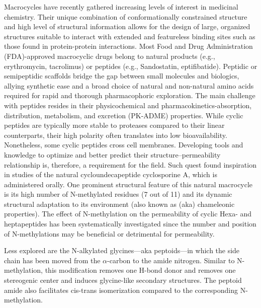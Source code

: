 Macrocycles have recently gathered increasing levels of interest in medicinal chemistry. \cite{Driggers2008, Mallinson2012, Dougherty2017, Marsault2011, Abdalla2018, Marsault2017}
Their unique combination of conformationally constrained structure and high level of structural information allows for the design of large, organized structures suitable to interact with extended and featureless binding sites such as those found in protein-protein interactions.\cite{Janin2008, Chène2006, Scott2016, Modell2016} 
Most Food and Drug Administration (FDA)-approved macrocyclic drugs belong to natural products (e.g., erythromycin, tacrolimus) or peptides (e.g., Sandostatin, eptifibatide). \cite{Giordanetto2014}
Peptidic or semipeptidic scaffolds bridge the gap between small molecules and biologics, allying synthetic ease and a broad choice of natural and non-natural amino acids required for rapid and thorough pharmacophoric exploration. 
The main challenge with peptides resides in their physicochemical and pharmacokinetics-absorption, distribution, metabolism, and excretion (PK-ADME) properties. 
While cyclic peptides are typically more stable to proteases compared to their linear counterparts, their high polarity often translates into low bioavailability.\cite{Naylor2017, Fosgerau2015}
Nonetheless, some cyclic peptides cross cell membranes.\cite{Naylor2017, Wang2014, Nielsen2014} 
Developing tools and knowledge to optimize and better predict their structure–permeability relationship is, therefore, a requirement for the field. Such quest found inspiration in studies of the natural cycloundecapeptide cyclosporine A, which is administered orally. 
One prominent structural feature of this natural macrocycle is its high number of N-methylated residues (7 out of 11) and its dynamic structural adaptation to its environment (also known as (aka) chameleonic properties). \cite{Whitty2016, Danelius2020, Witek2017}
The effect of N-methylation on the permeability of cyclic Hexa- and heptapeptides has been systematically investigated since the number and position of N-methylations may be beneficial or detrimental for permeability. \cite{Nielsen2014, Räder2018, White2011, Beck2012, Biron2008, White2011} 

Less explored are the N-alkylated glycines—aka peptoids—in which the side chain has been moved from the $\alpha$-carbon to the amide nitrogen. \cite{Schwochert2015} 
Similar to N-methylation, this modification removes one H-bond donor and removes one stereogenic center and induces glycine-like secondary structures.
The peptoid amide also facilitates cis-trans isomerization compared to the corresponding N-methylation.\cite{Sui2007} 

